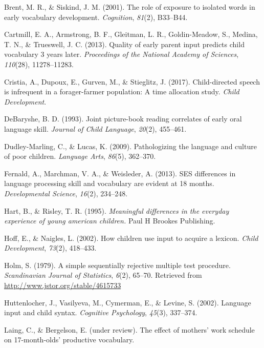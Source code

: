 \documentclass[man]{apa6}
\theoremstyle{definition}
\theoremstyle{definition}
\theoremstyle{definition}
\theoremstyle{remark}
\begin{document}
\hypertarget{ref-brent2001role}{}
Brent, M. R., \& Siskind, J. M. (2001). The role of exposure to isolated
words in early vocabulary development. \emph{Cognition}, \emph{81}(2),
B33--B44.

\hypertarget{ref-cartmill2013quality}{}
Cartmill, E. A., Armstrong, B. F., Gleitman, L. R., Goldin-Meadow, S.,
Medina, T. N., \& Trueswell, J. C. (2013). Quality of early parent input
predicts child vocabulary 3 years later. \emph{Proceedings of the
National Academy of Sciences}, \emph{110}(28), 11278--11283.

\hypertarget{ref-cristia2017child}{}
Cristia, A., Dupoux, E., Gurven, M., \& Stieglitz, J. (2017).
Child-directed speech is infrequent in a forager-farmer population: A
time allocation study. \emph{Child Development}.

\hypertarget{ref-debaryshe1993joint}{}
DeBaryshe, B. D. (1993). Joint picture-book reading correlates of early
oral language skill. \emph{Journal of Child Language}, \emph{20}(2),
455--461.

\hypertarget{ref-dudley2009pathologizing}{}
Dudley-Marling, C., \& Lucas, K. (2009). Pathologizing the language and
culture of poor children. \emph{Language Arts}, \emph{86}(5), 362--370.

\hypertarget{ref-fernald2013ses}{}
Fernald, A., Marchman, V. A., \& Weisleder, A. (2013). SES differences
in language processing skill and vocabulary are evident at 18 months.
\emph{Developmental Science}, \emph{16}(2), 234--248.

\hypertarget{ref-hart1995meaningful}{}
Hart, B., \& Risley, T. R. (1995). \emph{Meaningful differences in the
everyday experience of young american children.} Paul H Brookes
Publishing.

\hypertarget{ref-hoff2002children}{}
Hoff, E., \& Naigles, L. (2002). How children use input to acquire a
lexicon. \emph{Child Development}, \emph{73}(2), 418--433.

\hypertarget{ref-holm1979simple}{}
Holm, S. (1979). A simple sequentially rejective multiple test
procedure. \emph{Scandinavian Journal of Statistics}, \emph{6}(2),
65--70. Retrieved from \url{http://www.jstor.org/stable/4615733}

\hypertarget{ref-huttenlocher2002language}{}
Huttenlocher, J., Vasilyeva, M., Cymerman, E., \& Levine, S. (2002).
Language input and child syntax. \emph{Cognitive Psychology},
\emph{45}(3), 337--374.

\hypertarget{ref-Laing_Bergelson_17}{}
Laing, C., \& Bergelson, E. (under review). The effect of mothers' work
schedule on 17-month-olds' productive vocabulary.
\end{document}
